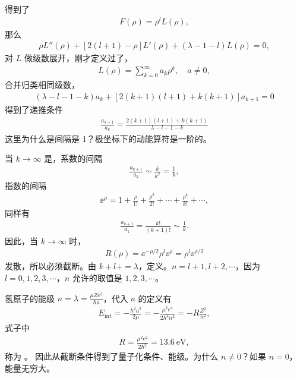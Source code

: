 得到了
\begin{align}
    F(\rho) = \rho^l L(\rho),
\end{align}
那么
\begin{align}
    \rho L''(\rho) + [2(l+1) -\rho]L'(\rho) + (\lambda - 1 -l) L(\rho) = 0, \label{eq:hydro_L_initial_def}
\end{align}
对 $L$ 做级数展开，刚才定义过了，
\begin{align}
    L(\rho) = \sum_{k=0}^\infty a_k \rho^k, \quad a\neq 0,
\end{align}
合并归类相同级数，
\begin{align}
    (\lambda - l - 1 - k)a_k + 
    \left[
        2(k+1) (l+1) + k(k+1)
    \right] a_{k+1} = 0
\end{align}
得到了递推条件
\begin{align}
    \frac{a_{k+1}}{a_k} = \frac{2(k+1) (l+1) + k(k+1)} {\lambda - l - 1 - k}
\end{align}
这里为什么是间隔是 1？极坐标下的动能算符是一阶的。

当 $k\rightarrow\infty$ 是，系数的间隔
\begin{align}
    \frac{a_{k+1}}{a_k} \sim \frac{k}{k^2} = \frac1{k},
\end{align}
指数的间隔
\begin{align}
    \ee^\rho = 1 + \frac{\rho}{1!} + \frac{\rho^2}{2!} + \cdots + \frac{\rho^k}{k!} + \cdots,
\end{align}
同样有
\begin{align}
    \frac{a_{k+1}}{a_k} = \frac{k!}{(k+1)!} \sim \frac1{k}. 
\end{align}
因此，当 $k\rightarrow\infty$ 时，
\begin{align}
    R(\rho) = \ee^{-\rho/2} \rho^l \ee^{\rho} = \rho^l \ee^{\rho/2}
\end{align}
发散，所以必须截断。由 $k+l+ = \lambda$，定义。$n=l+1, l+2, \cdots$，因为 $l=0,1,2,3,\cdots$，$n$ 允许的取值是 $1,2,3,\cdots$。

氢原子的能级 $n = \lambda = \frac{\mu Z e^2}{\hbar a}$，代入 $a$ 的定义有
\begin{align}
    E_{\mathrm{int}} = -\frac{\hbar^2a^2}{2\mu} = - \frac{\mu^2 e^4} {2\hbar^2 n^2} = - R\frac{Z^2}{n^2},
\end{align}
式子中
\begin{align}
    R = \frac{\mu^2e^2}{2\hbar^2} = \SI{13.6}{\electronvolt},
\end{align}
称为 。
因此从截断条件得到了量子化条件、能级。为什么 $n\neq 0$？如果 $n=0$，能量无穷大。


